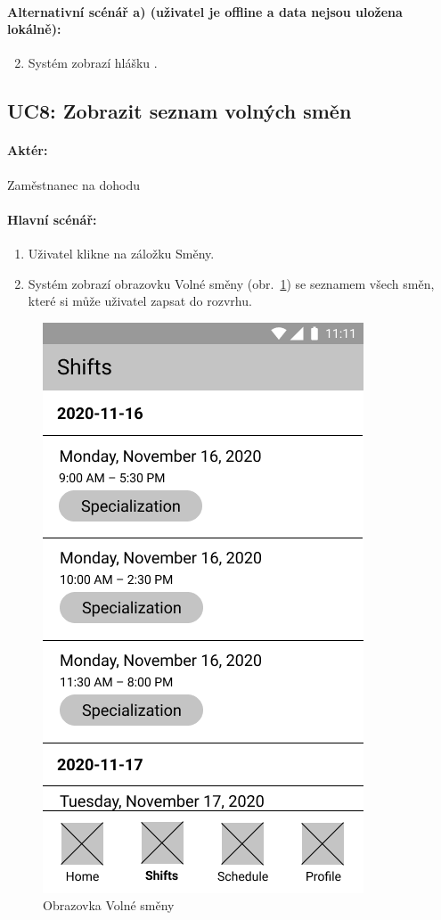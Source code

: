 \documentclass[twoside]{ctuthesis}
\begin{document}
\paragraph{Alternativní scénář a) (uživatel je offline a data nejsou uložena lokálně):}
\begin{enumerate}[label=\arabic*a]
	\setcounter{enumi}{1}
	\item Systém zobrazí hlášku .
\end{enumerate}

\newpage
\subsection{UC8: Zobrazit seznam volných směn}
\paragraph{Aktér:} Zaměstnanec na dohodu
\paragraph{Hlavní scénář:}
\begin{enumerate}
	\item Uživatel klikne na záložku Směny.
	\item Systém zobrazí obrazovku Volné směny (obr.~\ref{fig:unassigned}) se seznamem všech směn, které si může uživatel zapsat do rozvrhu.
\end{enumerate}

\begin{figure}[h!]
		\includegraphics[scale=.35]{img/main-shifts.png}
		\caption{Obrazovka Volné směny}
		\label{fig:unassigned}
\end{figure}
\end{document}
